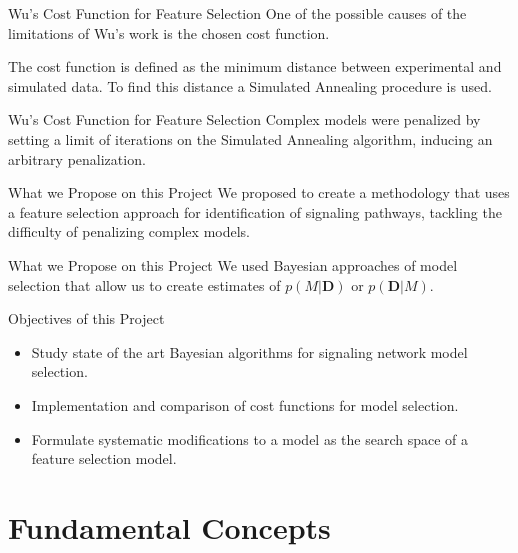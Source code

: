 \documentclass{beamer}
\begin{document}
\begin{frame}{Wu's Cost Function for Feature Selection}
One of the possible causes of the limitations of Wu's work is the chosen
cost function.
\pause

The cost function is defined as the minimum distance between 
experimental and simulated data. To find this distance a Simulated 
Annealing  procedure is used.
\end{frame}

\begin{frame}{Wu's Cost Function for Feature Selection}
Complex models were penalized by setting a limit of iterations on the
Simulated Annealing algorithm, \pause inducing an \alert{arbitrary
penalization}.
\end{frame}


\begin{frame}{What we Propose on this Project}
We proposed to create a methodology that uses a feature selection 
approach for identification of signaling pathways, tackling the 
difficulty of \alert{penalizing complex models}.
\end{frame}

\begin{frame}{What we Propose on this Project}
We used Bayesian approaches of model selection that allow us to
create estimates of $p (M | {\bm D})$ or $p ({\bm D} | M)$.
\end{frame}

\begin{frame}{Objectives of this Project}
\begin{itemize}
\pause
\item{Study state of the art Bayesian algorithms for signaling network
    model selection.}
\pause
\item{Implementation and comparison of cost functions for model
    selection.}
\pause
\item{Formulate systematic modifications to a model as the search space
    of a feature selection model.}
\end{itemize}
\end{frame}


\section{Fundamental Concepts}
\end{document}
